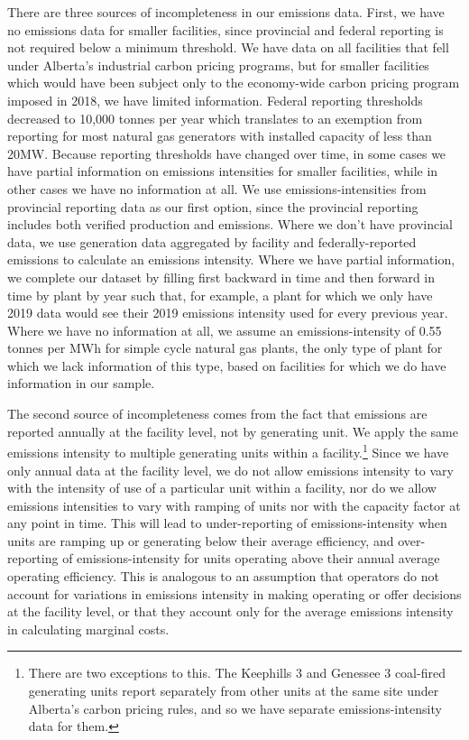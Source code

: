 \documentclass[12pt]{article}
\begin{document}
There are three sources of incompleteness in our emissions data. First, we have no emissions data for smaller facilities, since provincial and federal reporting is not required below a minimum threshold. We have data on all facilities that fell under Alberta's industrial carbon pricing programs, but for smaller facilities which would have been subject only to the economy-wide carbon pricing program imposed in 2018, we have limited information. Federal reporting thresholds decreased to 10,000 tonnes per year which translates to an exemption from reporting for most natural gas generators with installed capacity of less than 20MW. Because reporting thresholds have changed over time, in some cases we have partial information on emissions intensities for smaller facilities, while in other cases we have no information at all. We use emissions-intensities from provincial reporting data as our first option, since the provincial reporting includes both verified production and emissions. Where we don't have provincial data, we use generation data aggregated by facility and federally-reported emissions to calculate an emissions intensity. Where we have partial information, we complete our dataset by filling first backward in time and then forward in time by plant by year such that, for example, a plant for which we only have 2019 data would see their 2019 emissions intensity used for every previous year. Where we have no information at all, we assume an emissions-intensity of 0.55 tonnes per MWh for simple cycle natural gas plants, the only type of plant for which we lack information of this type, based on facilities for which we do have information in our sample.

The second source of incompleteness comes from the fact that emissions are reported annually at the facility level, not by generating unit. We apply the same emissions intensity to multiple generating units within a facility.\footnote{There are two exceptions to this. The Keephills 3 and Genessee 3 coal-fired generating units report separately from other units at the same site under Alberta's carbon pricing rules, and so we have separate emissions-intensity data for them.} Since we have only annual data at the facility level, we do not allow emissions intensity to vary with the intensity of use of a particular unit within a facility, nor do we allow emissions intensities to vary with ramping of units nor with the capacity factor at any point in time. This will lead to under-reporting of emissions-intensity when units are ramping up or generating below their average efficiency, and over-reporting of emissions-intensity for units operating above their annual average operating efficiency. This is analogous to an assumption that operators do not account for variations in emissions intensity in making operating or offer decisions at the facility level, or that they account only for the average emissions intensity in calculating marginal costs.
\end{document}
